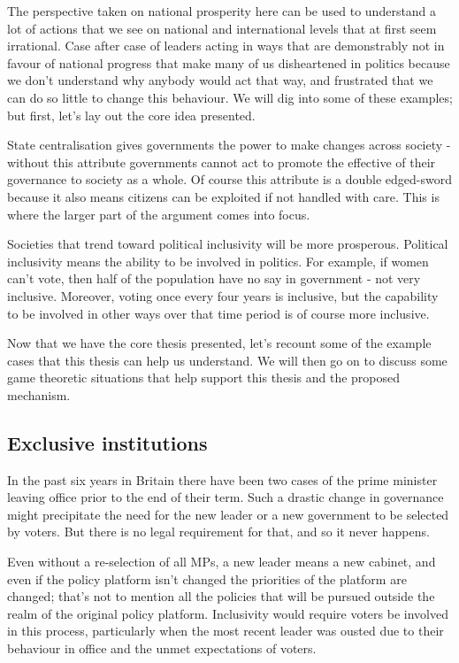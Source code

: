 \documentclass[twoside]{article}
\theoremstyle{definition}
\begin{document}
The perspective taken on national prosperity here can be used to understand a lot of actions that we see on national and international levels that at first seem irrational. Case after case of leaders acting in ways that are demonstrably not in favour of national progress that make many of us disheartened in politics because we don’t understand why anybody would act that way, and frustrated that we can do so little to change this behaviour. We will dig into some of these examples; but first, let’s lay out the core idea presented.

State centralisation gives governments the power to make changes across society - without this attribute governments cannot act to promote the effective of their governance to society as a whole. Of course this attribute is a double edged-sword because it also means citizens can be exploited if not handled with care. This is where the larger part of the argument comes into focus.

Societies that trend toward political inclusivity will be more prosperous. Political inclusivity means the ability to be involved in politics. For example, if women can’t vote, then half of the population have no say in government - not very inclusive. Moreover, voting once every four years is inclusive, but the capability to be involved in other ways over that time period is of course more inclusive.

Now that we have the core thesis presented, let’s recount some of the example cases that this thesis can help us understand. We will then go on to discuss some game theoretic situations that help support this thesis and the proposed mechanism.

\subsection{Exclusive institutions}

In the past six years in Britain there have been two cases of the prime minister leaving office prior to the end of their term. Such a drastic change in governance might precipitate the need for the new leader or a new government to be selected by voters. But there is no legal requirement for that, and so it never happens.

Even without a re-selection of all MPs, a new leader means a new cabinet, and even if the policy platform isn’t changed the priorities of the platform are changed; that’s not to mention all the policies that will be pursued outside the realm of the original policy platform. Inclusivity would require voters be involved in this process, particularly when the most recent leader was ousted due to their behaviour in office and the unmet expectations of voters.
\end{document}
